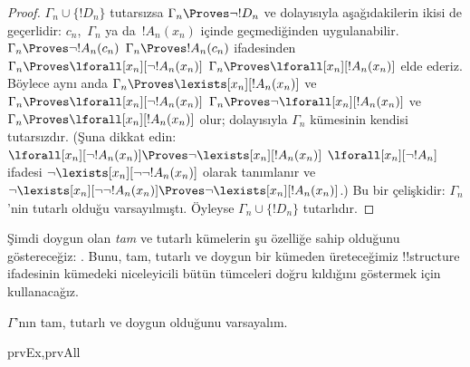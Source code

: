 \begin{proof}
$\Gamma_n\cup\{!D_n\}$ tutarsızsa $\Gamma_n\Proves\lnot !D_n$ ve
dolayısıyla aşağıdakilerin ikisi de geçerlidir:
$c_n$,~$\Gamma_n$ ya da~$!A_n(x_n)$ içinde geçmediğinden
uygulanabilir.
{$\Gamma_n\Proves\lnot !A_n(c_n)$}
{$\Gamma_n\Proves !A_n(c_n)$}
ifadesinden
{$\Gamma_n\Proves\lforall[x_n][\lnot !A_n(x_n)]$}
{$\Gamma_n\Proves\lforall[x_n][!A_n(x_n)]$}
elde ederiz. Böylece aynı anda
{$\Gamma_n\Proves\lexists[x_n][!A_n(x_n)]$ ve
$\Gamma_n\Proves\lforall[x_n][\lnot !A_n(x_n)]$}
{$\Gamma_n\Proves\lnot\lforall[x_n][!A_n(x_n)]$ ve
$\Gamma_n\Proves\lforall[x_n][!A_n(x_n)]$}
olur; dolayısıyla $\Gamma_n$ kümesinin kendisi tutarsızdır.
{(Şuna dikkat edin:
{$\lforall[x_n][\lnot !A_n(x_n)]\Proves
  \lnot\lexists[x_n][!A_n(x_n)]$}
{$\lforall[x_n][\lnot !A_n]$ ifadesi
  $\lnot\lexists[x_n][\lnot\lnot !A_n(x_n)]$ olarak tanımlanır ve
  $\lnot\lexists[x_n][\lnot\lnot !A_n(x_n)]\Proves
  \lnot\lexists[x_n][!A_n(x_n)]$}.)}{}
Bu bir çelişkidir: $\Gamma_n$'nin tutarlı olduğu varsayılmıştı.
Öyleyse $\Gamma_n\cup\{!D_n\}$ tutarlıdır.
\end{proof}

\begin{explain}
Şimdi doygun olan \emph{tam} ve tutarlı kümelerin şu özelliğe sahip
olduğunu göstereceğiz: 
. Bunu, tam,
tutarlı ve doygun bir kümeden üreteceğimiz !!{structure} ifadesinin
kümedeki niceleyicili bütün tümceleri doğru kıldığını göstermek için
kullanacağız.
\end{explain}

\begin{prop}
$\Gamma$'nın tam, tutarlı ve doygun olduğunu varsayalım.
\begin{tagenumerate}{prvEx,prvAll}
\end{tagenumerate}
\end{prop}

